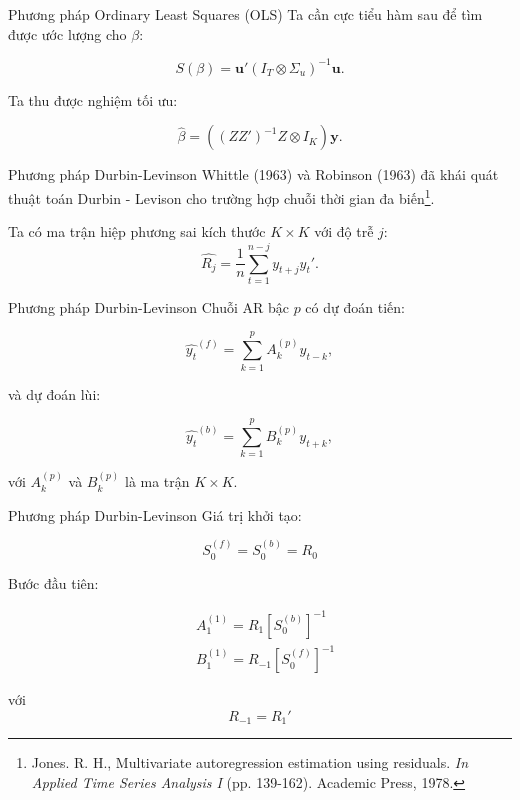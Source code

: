 \begin{frame}{Phương pháp Ordinary Least Squares (OLS)}
Ta cần cực tiểu hàm sau để tìm được ước lượng cho $\beta$:

\begin{equation}
    S(\beta) = \textbf{u}' (I_T \otimes \Sigma_u)^{-1} \textbf{u}.
\end{equation}

Ta thu được nghiệm tối ưu:

\begin{equation}
    \hat{\beta} = ((ZZ')^{-1}Z \otimes I_K )\textbf{y}.
\end{equation}
\end{frame}

\begin{frame}{Phương pháp  Durbin-Levinson}
    Whittle (1963) và Robinson (1963) đã khái quát thuật toán Durbin - Levison cho trường hợp chuỗi thời gian đa biến\footnote{Jones. R. H.,  Multivariate autoregression estimation using residuals. \textit{In Applied Time Series Analysis I} (pp. 139-162). Academic Press, 1978.}.

    Ta có ma trận hiệp phương sai kích thước $K \times K$ với độ trễ $j$:
\begin{equation}
    \hat{R_j} = \frac{1}{n} \sum_{t = 1} ^{n-j} y_{t+j} y_t '.
\end{equation}
\end{frame}

\begin{frame}{Phương pháp  Durbin-Levinson}
    Chuỗi AR bậc $p$ có dự đoán tiến:

\begin{equation}
    \hat{y_t}^{(f)} = \sum_{k = 1}^p A_k^{(p)} y_{t-k},
\end{equation}

và dự đoán lùi:

\begin{equation}
    \hat{y_t}^{(b)} = \sum_{k=1}^p B_k^{(p)} y_{t+k}, 
\end{equation}

với $A_k^{(p)}$ và $B_k^{(p)}$ là ma trận $K \times K$. 
\end{frame}

\begin{frame}{Phương pháp  Durbin-Levinson}
    Giá trị khởi tạo:

\begin{equation}
    S_0^{(f)} = S_0^{(b)} = R_0
\end{equation}

Bước đầu tiên:

\begin{align}
    & A_1^{(1)} = R_1 \left[ S_0 ^{(b)} \right]^{-1} \\
    & B_1^{(1)} = R_{-1} \left[ S_0 ^{(f)} \right]^{-1}
\end{align}


với 
\[
    R_{-1} = R_1'
\]
\end{frame}


